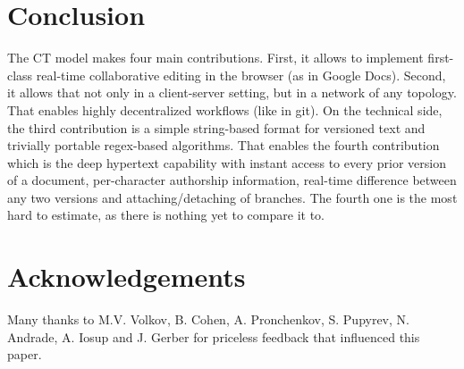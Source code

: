 \documentclass{sig-alternate}
\begin{document}
\section {Conclusion} \label{sec:conclusion}


The CT model makes four main contributions. First, it allows to implement first-class real-time collaborative editing in the browser (as in Google Docs). Second, it allows that not only in a client-server setting, but in a network of any topology. That enables highly decentralized workflows (like in git). 
On the technical side, the third contribution is a simple string-based format for versioned text and trivially portable regex-based algorithms. 
That enables the fourth contribution which is the deep hypertext capability with instant access to every prior version of a document, per-character authorship information, real-time difference between any two versions and attaching/detaching of branches.
The fourth one is the most hard to estimate, as there is nothing yet to compare it to.


\section{Acknowledgements}

Many thanks to M.V. Volkov, B. Cohen, A. Pronchenkov, S. Pupyrev, N. Andrade, A. Iosup and J. Gerber for priceless feedback that influenced this paper. 

\small

\end{document}
